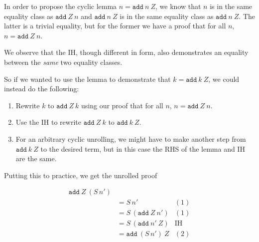 \documentclass{article}[11pt]
\newcommand{\add}[2]{\texttt{add}\ #1 \ #2}
\newcommand{\next}[1]{S \, #1}
\begin{document}
In order to propose the cyclic lemma \(n = \add n Z\), we know that \(n\) is in
the same equality class as \(\add Z n\) and \(\add n Z\) is in the same equality
class as \(\add n Z\). The latter is a trivial equality, but for the former we
have a proof that for all \(n\), \(n = \add Z n\).

We observe that the IH, though different in form, also demonstrates an equality
between the \emph{same} two equality classes.

So if we wanted to use the lemma to demonstrate that \(k = \add k Z\), we could
instead do the following:

\begin{enumerate}
  \item Rewrite \(k\) to \(\add Z k\) using our proof that for all \(n\), \(n = \add Z n\).
  \item Use the IH to rewrite \(\add Z k\) to \(\add k Z\).
  \item For an arbitrary cyclic unrolling, we might have to make another step
        from \(\add k Z\) to the desired term, but in this case the RHS of the
        lemma and IH are the same.
\end{enumerate}

Putting this to practice, we get the unrolled proof

\[
\begin{array}{lll}
  \add Z {(\next n')} & & \\
  &= \next n' & (1) \\
  &= \next (\add Z {n'}) & (1) \\
  &= \next (\add {n'} Z) & \text{IH} \\
  &= \add {(\next n')} Z & (2) \\
\end{array}
\]
\end{document}
